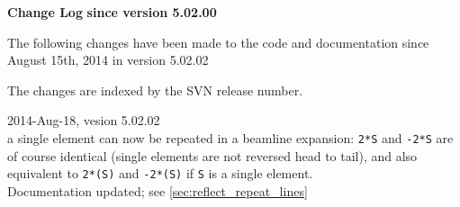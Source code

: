 \begin{center} 
\textbf{\madx Change Log}
\vspace{1cm}
\textbf{since version 5.02.00}
\end{center}

The following changes have been made to the code and documentation since
August 15th, 2014 in version 5.02.02

The changes are indexed by the SVN release number. 

\begin{madlist}

   2014-Aug-18, vesion 5.02.02 \\
  a single element can now be repeated in a beamline expansion:
  \texttt{2*S} and \texttt{-2*S} are of course identical (single
  elements are not reversed head to tail), and also equivalent to
  \texttt{2*(S)} and \texttt{-2*(S)} if \texttt{S} is a single
  element.\\
  Documentation updated; see \ref{sec:reflect_repeat_lines}


\end{madlist}
  


\newpage

